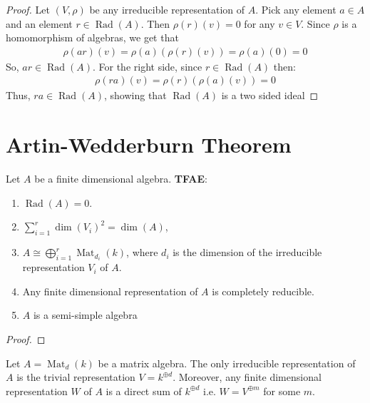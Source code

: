 \begin{proof}
    Let $(V, \rho)$ be any irreducible representation of $A$. Pick any element $a \in A$ and an element $r \in \operatorname{Rad}(A)$. Then $\rho(r)(v) = 0$ for any $v \in V$. Since $\rho$ is a homomorphism of algebras, we get that
    \begin{align*}
       \rho(ar)(v) = \rho(a)(\rho(r)(v)) = \rho(a)(0) = 0
    \end{align*}
So, $ar \in \operatorname{Rad}(A)$. For the right side, since $r \in \operatorname{Rad}(A)$ then:
\begin{align*}
    \rho(ra)(v) = \rho(r)(\rho(a)(v)) = 0
\end{align*}
Thus, $ra \in \operatorname{Rad}(A)$, showing that $\operatorname{Rad}(A)$ is a two sided ideal
\end{proof}

\section{Artin-Wedderburn Theorem}
\begin{theorem} \label{theorem 3.8}
    Let $A$ be a finite dimensional algebra. \textbf{TFAE}:
    \begin{enumerate}
         \item $\operatorname{Rad}(A) = 0$.
        \item $\displaystyle \sum_{i=1}^r \dim(V_i)^2 = \dim(A)$,
        \item $A \cong \displaystyle \bigoplus_{i=1}^r \operatorname{Mat}_{d_i}(k)$, where $d_i$ is the dimension of the irreducible representation $V_i$ of $A$.
        \item Any finite dimensional representation of $A$ is completely reducible.
        \item $A$ is a semi-simple algebra
    \end{enumerate}

\end{theorem}
\begin{proof}
    
\end{proof}
\begin{theorem}
    Let $A = \operatorname{Mat}_d(k)$ be a matrix algebra. The only irreducible representation of $A$ is the trivial representation $V = k^{\oplus d}$. Moreover, any finite dimensional representation $W$ of $A$ is a direct sum of $k^{\oplus d}$ i.e. $W = V^{\oplus m}$ for some $m$.
\end{theorem}

